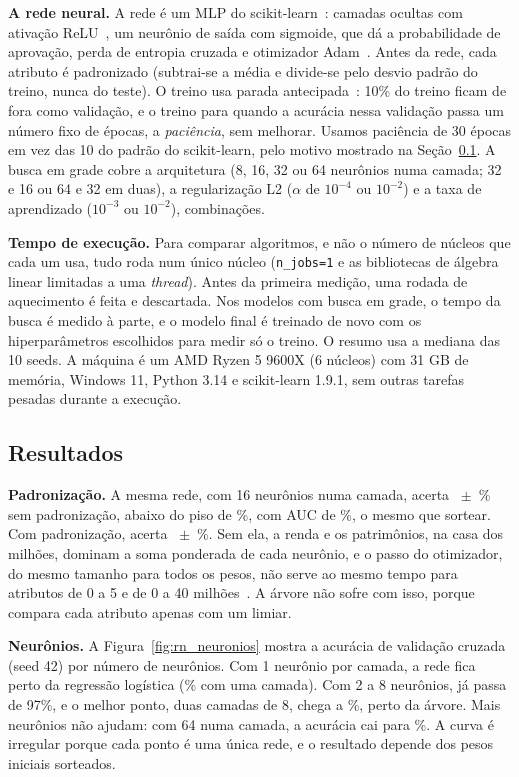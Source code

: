 \textbf{A rede neural.} A rede é um MLP do scikit-learn~\cite{pedregosa:11}: camadas ocultas com ativação ReLU~\cite{nair:10}, um neurônio de saída com sigmoide, que dá a probabilidade de aprovação, perda de entropia cruzada e otimizador Adam~\cite{kingma:15}. Antes da rede, cada atributo é padronizado (subtrai-se a média e divide-se pelo desvio padrão do treino, nunca do teste). O treino usa parada antecipada~\cite{prechelt:98}: 10\% do treino ficam de fora como validação, e o treino para quando a acurácia nessa validação passa um número fixo de épocas, a \emph{paciência}, sem melhorar. Usamos paciência de 30 épocas em vez das 10 do padrão do scikit-learn, pelo motivo mostrado na Seção~\ref{sec:rn_resultados}. A busca em grade cobre a arquitetura (8, 16, 32 ou 64 neurônios numa camada; 32 e 16 ou 64 e 32 em duas), a regularização L2 ($\alpha$ de $10^{-4}$ ou $10^{-2}$) e a taxa de aprendizado ($10^{-3}$ ou $10^{-2}$), \rnCombinacoes{} combinações.

\textbf{Tempo de execução.} Para comparar algoritmos, e não o número de núcleos que cada um usa, tudo roda num único núcleo (\texttt{n\_jobs=1} e as bibliotecas de álgebra linear limitadas a uma \emph{thread}). Antes da primeira medição, uma rodada de aquecimento é feita e descartada. Nos modelos com busca em grade, o tempo da busca é medido à parte, e o modelo final é treinado de novo com os hiperparâmetros escolhidos para medir só o treino. O resumo usa a mediana das 10 seeds. A máquina é um AMD Ryzen 5 9600X (6 núcleos) com 31 GB de memória, Windows 11, Python 3.14 e scikit-learn 1.9.1, sem outras tarefas pesadas durante a execução.

\subsection{Resultados}\label{sec:rn_resultados}

\textbf{Padronização.} A mesma rede, com 16 neurônios numa camada, acerta \rnSemPadAcc~$\pm$~\rnSemPadSd\% sem padronização, abaixo do piso de \rnAprovados\%, com AUC de \rnSemPadAuc\%, o mesmo que sortear. Com padronização, acerta \rnComPadAcc~$\pm$~\rnComPadSd\%. Sem ela, a renda e os patrimônios, na casa dos milhões, dominam a soma ponderada de cada neurônio, e o passo do otimizador, do mesmo tamanho para todos os pesos, não serve ao mesmo tempo para atributos de 0 a 5 e de 0 a 40 milhões~\cite{lecun:98}. A árvore não sofre com isso, porque compara cada atributo apenas com um limiar.

\textbf{Neurônios.} A Figura~\ref{fig:rn_neuronios} mostra a acurácia de validação cruzada (seed 42) por número de neurônios. Com 1 neurônio por camada, a rede fica perto da regressão logística (\rnNeurUm\% com uma camada). Com 2 a 8 neurônios, já passa de 97\%, e o melhor ponto, duas camadas de 8, chega a \rnNeurOitoDuas\%, perto da árvore. Mais neurônios não ajudam: com 64 numa camada, a acurácia cai para \rnNeurSessentaQuatro\%. A curva é irregular porque cada ponto é uma única rede, e o resultado depende dos pesos iniciais sorteados.

